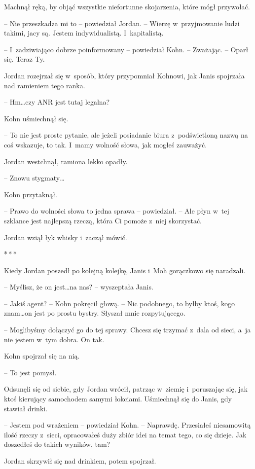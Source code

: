 \documentclass[oneside,polish,11pt,sfheadings]{mwbk}
\newcommand{\threeast}{\bigskip\par\centerline{*\,*\,*}\medskip\par}%
\begin{document}
Machnął ręką, by objąć wszystkie niefortunne skojarzenia, które mógł
przywołać.

-- Nie przeszkadza mi to -- powiedział Jordan. -- Wierzę w~przyjmowanie
ludzi takimi, jacy są. Jestem indywidualistą. I~kapitalistą.

-- I~zadziwiająco dobrze poinformowany -- powiedział Kohn. -- Zważając. -- Oparł się. Teraz Ty.

Jordan rozejrzał się w~sposób, który przypomniał Kohnowi, jak Janis
spojrzała nad ramieniem tego ranka.

-- Hm\ldots czy ANR jest tutaj legalna?

Kohn uśmiechnął się. 

-- To nie jest proste pytanie, ale jeżeli posiadanie
biura z~podświetloną nazwą na coś wskazuje, to tak. I~mamy wolność
słowa, jak mogłeś zauważyć.

Jordan westchnął, ramiona lekko opadły.

-- Znowu stygmaty\ldots

Kohn przytaknął. 

-- Prawo do wolności słowa to jedna sprawa -- powiedział.
-- Ale płyn w~tej szklance jest najlepszą rzeczą, która Ci pomoże z~niej
skorzystać.

Jordan wziął łyk whisky i~zaczął mówić.

\threeast

Kiedy Jordan poszedł po kolejną kolejkę, Janis i~Moh gorączkowo się
naradzali.

-- Myślisz, że on jest\ldots na nas? -- wyszeptała Janis.

-- Jakiś agent? -- Kohn pokręcił głową. -- Nic podobnego, to byłby ktoś,
kogo znam\ldots on jest po prostu bystry. Słyszał mnie rozpytującego.

-- Moglibyśmy dołączyć go do tej sprawy. Chcesz się trzymać z~dala od
sieci, a~ja nie jestem w~tym dobra. On tak.

Kohn spojrzał się na nią. 

-- To jest pomysł.

Odsunęli się od siebie, gdy Jordan wrócił, patrząc w~ziemię i~poruszając
się, jak ktoś kierujący samochodem samymi łokciami. Uśmiechnął się do
Janis, gdy stawiał drinki.

-- Jestem pod wrażeniem -- powiedział Kohn. -- Naprawdę. Przesiałeś
niesamowitą ilość rzeczy z~sieci, opracowałeś duży zbiór idei na temat
tego, co się dzieje. Jak doszedłeś do takich wyników, tam?

Jordan skrzywił się nad drinkiem, potem spojrzał. 
\end{document}
